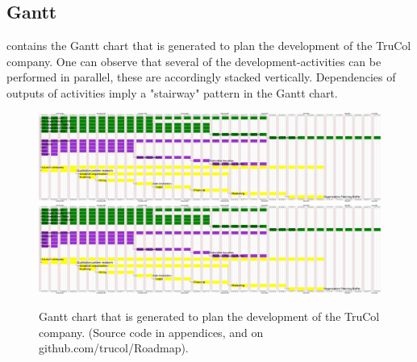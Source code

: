 \subsection{Gantt}
 contains the Gantt chart that is generated to plan the development of the TruCol company. One can observe that several of the development-activities can be performed in parallel, these are accordingly stacked vertically. Dependencies of outputs of activities imply a "stairway" pattern in the Gantt chart.

\clearpage
\begin{figure}
\hspace*{-0cm}
	\ifx\homepath\overleafhome
		\includegraphics[width=775pt]{Images/Diagrams/gantt.png}
	\else
		\includegraphics[width=775pt]{latex/Images/Diagrams/gantt.png}
	\fi
    \caption{Gantt chart that is generated to plan the development of the TruCol company. (Source code in appendices, and on github.com/trucol/Roadmap).}
    \label{fig:gantt}
\end{figure}
\clearpage
